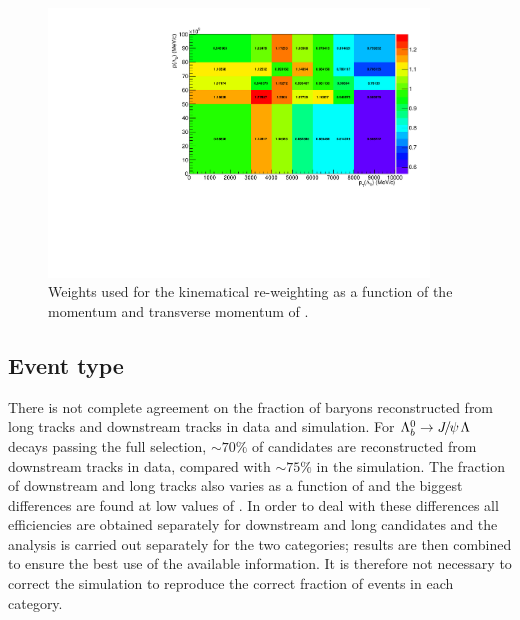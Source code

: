\begin{figure}
\centering
\includegraphics[width=0.9\textwidth]{Lmumu/figs/ratio_Lb_p_pt.pdf}
 \caption{Weights used for the kinematical re-weighting as a function of the momentum and transverse momentum of \Lb. }
\label{fig:kinWeight}
\end{figure}

\subsection{Event type}

There is not complete agreement on the fraction of \Lz baryons reconstructed from long tracks and downstream tracks in data and simulation.
For $\Lb\to\jpsi\Lz$ decays passing the full selection, $\sim 70\%$ of candidates are reconstructed from downstream tracks in data, 
compared with $\sim 75\%$ in the simulation.
The fraction of downstream and long tracks also varies as a function of \qsq and the biggest differences are found at low values of \qsq.
In order to deal with these differences all efficiencies are obtained separately for downstream and long candidates and the analysis is
carried out separately for the two categories; results are then combined to ensure the best use of the available information. 
It is therefore not necessary to correct the simulation to reproduce the correct fraction of events in each category.

